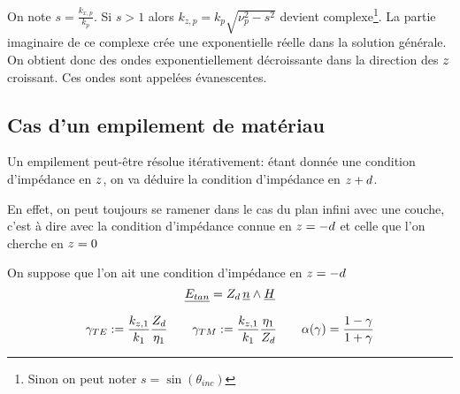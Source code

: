 On note $s=\frac{k_{x,p}}{k_p}$. Si $s>1$ alors $k_{z,p} = k_p\sqrt{\nu_p^2-s^2}$ devient complexe\footnote{Sinon on peut noter $s=\sin(\theta_{inc})$}.
La partie imaginaire de ce complexe crée une exponentielle réelle dans la solution générale. On obtient donc des ondes exponentiellement décroissante dans la direction des ${z}$ croissant. Ces ondes sont appelées évanescentes.

\subsection{Cas d'un empilement de matériau}

Un empilement peut-être résolue itérativement: étant donnée une condition d'impédance en ${z}$, on va déduire la condition d'impédance en ${z}+d$.

En effet, on peut toujours se ramener dans le cas du plan infini avec une couche, c'est à dire avec la condition d'impédance connue en ${z}=-d$ et celle que l'on cherche en ${z}=0$

On suppose que l'on ait une condition d'impédance en ${z}=-d$\[
\underline{ E_{tan}}=Z_d \, \underline{n} \wedge  \underline{H}
\]


\begin{align*}
\gamma_{TE} := \dfrac{k_{{z},1}}{k_1} \dfrac{Z_d}{\eta_1} \qquad
\gamma_{TM} := \dfrac{k_{{z},1}}{k_1}  \dfrac{\eta_1}{Z_d}  \qquad
\alpha(\gamma) = \dfrac{1-\gamma}{1+\gamma}
\end{align*}

